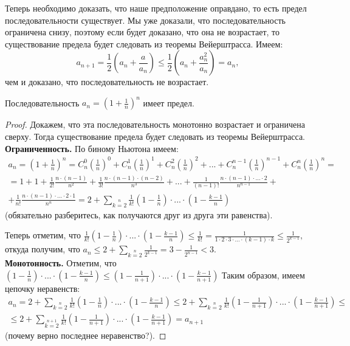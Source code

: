 Теперь необходимо доказать, что
наше предположение оправдано, то есть
предел последовательности существует.
Мы уже доказали, что последовательность
ограничена снизу, поэтому если будет
доказано, что она не возрастает, то
существование предела будет следовать
из теоремы Вейерштрасса. Имеем:
$$
    a_{n+1}=
    \frac{1}{2}\left(a_n
    +\frac{a}{a_n}\right)\leq
    \frac{1}{2}\left(a_n
    +\frac{a_n^2}{a_n}\right)=a_n,
$$
чем и доказано, что последовательность
не возрастает.

\begin{theorem}
    Последовательность $a_n=\left(1+\frac{1}{n}\right)^n$
    имеет предел.
\end{theorem}
\begin{proof}
    Докажем, что эта последовательность
    монотонно возрастает и ограничена
    сверху. Тогда существование предела
    будет следовать из теоремы Вейерштрасса.\\
    {\bf Ограниченность.} По биному Ньютона
    имеем:
    \begin{multline*}
        a_n=\left(1+\frac{1}{n}\right)^n=C_n^0\left(\frac{1}{n}\right)^0+
        C_n^1\left(\frac{1}{n}\right)^1+C_n^2\left(\frac{1}{n}\right)^2+
        ...+C_n^{n-1}\left(\frac{1}{n}\right)^{n-1}+
        C_n^n\left(\frac{1}{n}\right)^n=\\
        =1+1+\frac{1}{2!}\frac{n\cdot(n-1)}{n^2}+
        \frac{1}{3!}\frac{n\cdot(n-1)\cdot(n-2)}{n^3}+...+
        \frac{1}{(n-1)!}\frac{n\cdot(n-1)\cdot...\cdot2}{n^{n-1}}+\\
        +\frac{1}{n!}\frac{n\cdot(n-1)\cdot...\cdot2\cdot1}{n^n}=
        2+\sum\limits_{k=2}\limits^{n}\frac{1}{k!}
        \left(1-\frac{1}{n}\right)\cdot...\cdot\left(1-\frac{k-1}{n}\right)
    \end{multline*}
    (обязательно разберитесь, как получаются друг из друга
    эти равенства).

    Теперь отметим, что $\frac{1}{k!}
        \left(1-\frac{1}{n}\right)\cdot...
        \cdot\left(1-\frac{k-1}{n}\right)\leq\frac{1}{k!}
        =\frac{1}{1\cdot2\cdot3\cdot...\cdot(k-1)\cdot k}
        \leq\frac{1}{2^{k-1}},$ откуда получим, что
    $a_n\leq 2+\sum\limits_{k=2}\limits^{n}\frac{1}{2^{k-1}}=
        3-\frac{1}{2^{n-1}}<3.$\\
    {\bf Монотонность.} Отметим, что
    $\left(1-\frac{1}{n}\right)\cdot...\cdot
        \left(1-\frac{k-1}{n}\right)\leq
        \left(1-\frac{1}{n+1}\right)\cdot...
        \cdot\left(1-\frac{k-1}{n+1}\right)$
    Таким образом, имеем цепочку неравенств:
    \begin{multline*}
        a_n=2+\sum\limits_{k=2}\limits^{n}\frac{1}{k!}
        \left(1-\frac{1}{n}\right)\cdot...\cdot\left(1-\frac{k-1}{n}\right)
        \leq2+\sum\limits_{k=2}\limits^{n}\frac{1}{k!}
        \left(1-\frac{1}{n+1}\right)\cdot...\cdot\left(1-\frac{k-1}{n+1}\right)\leq\\
        \leq2+\sum\limits_{k=2}\limits^{n+1}\frac{1}{k!}
        \left(1-\frac{1}{n+1}\right)\cdot...\cdot\left(1-\frac{k-1}{n+1}\right)=a_{n+1}
    \end{multline*}
    (почему верно последнее неравенство?).


\end{proof}
